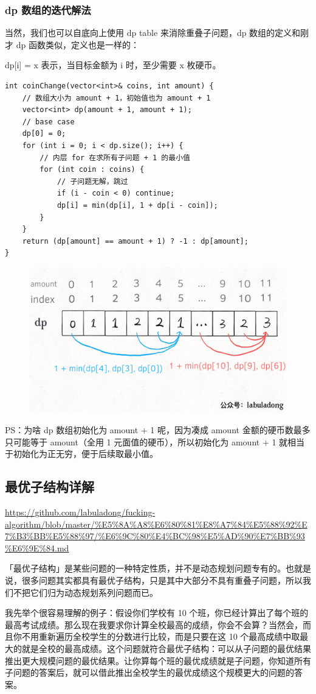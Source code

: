 \documentclass[12pt]{article}
\begin{document}
\subsubsection{dp 数组的迭代解法}
当然，我们也可以自底向上使用 dp table 来消除重叠子问题，dp 数组的定义和刚才 dp 函数类似，定义也是一样的：

dp[i] = x 表示，当目标金额为 i 时，至少需要 x 枚硬币。
\begin{lstlisting}
int coinChange(vector<int>& coins, int amount) {
    // 数组大小为 amount + 1，初始值也为 amount + 1
    vector<int> dp(amount + 1, amount + 1);
    // base case
    dp[0] = 0;
    for (int i = 0; i < dp.size(); i++) {
        // 内层 for 在求所有子问题 + 1 的最小值
        for (int coin : coins) {
            // 子问题无解，跳过
            if (i - coin < 0) continue;
            dp[i] = min(dp[i], 1 + dp[i - coin]);
        }
    }
    return (dp[amount] == amount + 1) ? -1 : dp[amount];
}
\end{lstlisting}

\begin{figure}[H]
    \centering
    \includegraphics[width=.5\textwidth]{fig/Dynamic_Programming_Recursion_Tree_6.jpg}
\end{figure}

PS：为啥 dp 数组初始化为 amount + 1 呢，因为凑成 amount 金额的硬币数最多只可能等于 amount（全用 1 元面值的硬币），所以初始化为 amount + 1 就相当于初始化为正无穷，便于后续取最小值。

\subsection{最优子结构详解}
\url{https://github.com/labuladong/fucking-algorithm/blob/master/%E5%8A%A8%E6%80%81%E8%A7%84%E5%88%92%E7%B3%BB%E5%88%97/%E6%9C%80%E4%BC%98%E5%AD%90%E7%BB%93%E6%9E%84.md}

「最优子结构」是某些问题的一种特定性质，并不是动态规划问题专有的。也就是说，很多问题其实都具有最优子结构，只是其中大部分不具有重叠子问题，所以我们不把它们归为动态规划系列问题而已。

我先举个很容易理解的例子：假设你们学校有 10 个班，你已经计算出了每个班的最高考试成绩。那么现在我要求你计算全校最高的成绩，你会不会算？当然会，而且你不用重新遍历全校学生的分数进行比较，而是只要在这 10 个最高成绩中取最大的就是全校的最高成绩。这个问题就符合最优子结构：可以从子问题的最优结果推出更大规模问题的最优结果。让你算每个班的最优成绩就是子问题，你知道所有子问题的答案后，就可以借此推出全校学生的最优成绩这个规模更大的问题的答案。
\end{document}
